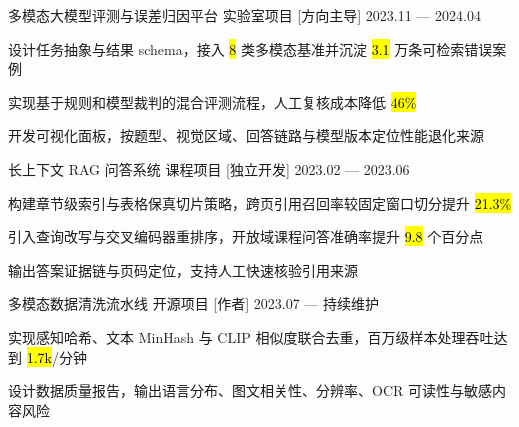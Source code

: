 

\Project
  {多模态大模型评测与误差归因平台}
  {实验室项目}
  [方向主导]
  {2023.11 — 2024.04}
\begin{Bullets}
  \item 设计任务抽象与结果 schema，接入 \hl{8} 类多模态基准并沉淀 \hl{3.1} 万条可检索错误案例
  \item 实现基于规则和模型裁判的混合评测流程，人工复核成本降低 \hl{46\%}
  \item 开发可视化面板，按题型、视觉区域、回答链路与模型版本定位性能退化来源
\end{Bullets}

\Project
  {长上下文 RAG 问答系统}
  {课程项目}
  [独立开发]
  {2023.02 — 2023.06}
\begin{Bullets}
  \item 构建章节级索引与表格保真切片策略，跨页引用召回率较固定窗口切分提升 \hl{21.3\%}
  \item 引入查询改写与交叉编码器重排序，开放域课程问答准确率提升 \hl{9.8} 个百分点
  \item 输出答案证据链与页码定位，支持人工快速核验引用来源
\end{Bullets}

\Project
  {多模态数据清洗流水线}
  {开源项目}
  [作者]
  {2023.07 — 持续维护}
\begin{Bullets}
  \item 实现感知哈希、文本 MinHash 与 CLIP 相似度联合去重，百万级样本处理吞吐达到 \hl{1.7k}/分钟
  \item 设计数据质量报告，输出语言分布、图文相关性、分辨率、OCR 可读性与敏感内容风险
\end{Bullets}
